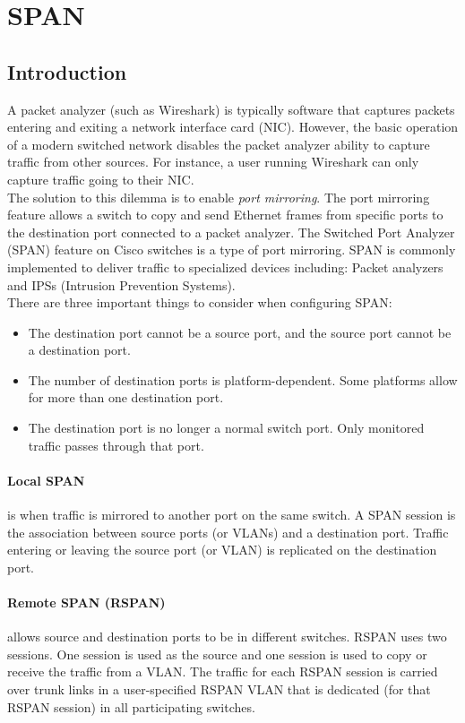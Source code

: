\section{SPAN}

\subsection{Introduction}
A packet analyzer (such as Wireshark) is typically software that captures packets entering and exiting a network interface card (NIC). However, the basic operation of a modern switched network disables the packet analyzer ability to capture traffic from other sources. For instance, a user running Wireshark can only capture traffic going to their NIC.\\

The solution to this dilemma is to enable \emph{port mirroring}. The port mirroring feature allows a switch to copy and send Ethernet frames from specific ports to the destination port connected to a packet analyzer. The Switched Port Analyzer (SPAN) feature on Cisco switches is a type of port mirroring. SPAN is commonly implemented to deliver traffic to specialized devices including: Packet analyzers and IPSs (Intrusion Prevention Systems).\\

There are three important things to consider when configuring SPAN:
\begin{itemize}
\item The destination port cannot be a source port, and the source port cannot be a destination port.
\item The number of destination ports is platform-dependent. Some platforms allow for more than one destination port.
\item The destination port is no longer a normal switch port. Only monitored traffic passes through that port.
\end{itemize}

\paragraph{Local SPAN} is when traffic is mirrored to another port on the same switch. A SPAN session is the association between source ports (or VLANs) and a destination port. Traffic entering or leaving the source port (or VLAN) is replicated on the destination port. 

\paragraph{Remote SPAN (RSPAN)} allows source and destination ports to be in different switches. RSPAN uses two sessions. One session is used as the source and one session is used to copy or receive the traffic from a VLAN. The traffic for each RSPAN session is carried over trunk links in a user-specified RSPAN VLAN that is dedicated (for that RSPAN session) in all participating switches. 

